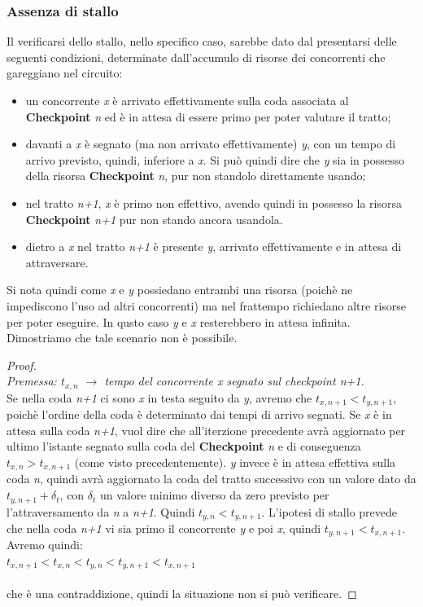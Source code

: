 \subsubsection{Assenza di stallo}
Il verificarsi dello stallo, nello specifico caso, sarebbe dato dal presentarsi
delle seguenti condizioni, determinate dall'accumulo di risorse dei concorrenti che gareggiano nel circuito:
\begin{itemize}
\item un concorrente \emph{x} è arrivato effettivamente sulla coda associata al \textbf{Checkpoint} \emph{n} ed
è in attesa di essere primo per poter valutare il tratto;
\item davanti a \emph{x} è segnato (ma non arrivato effettivamente) \emph{y}, con un tempo di arrivo previsto, quindi, inferiore a \emph{x}. 
Si può quindi dire che \emph{y} sia in possesso della risorsa \textbf{Checkpoint} \emph{n}, pur non standolo direttamente usando;
\item nel tratto \emph{n+1}, \emph{x} è primo non effettivo, avendo quindi in possesso la risorsa \textbf{Checkpoint} \emph{n+1} pur
non stando ancora usandola.
\item dietro a \emph{x} nel tratto \emph{n+1} è presente \emph{y}, arrivato effettivamente e in attesa di attraversare.
\end{itemize}
Si nota quindi come \emph{x} e \emph{y} possiedano entrambi una risorsa (poichè ne impediscono l'uso ad altri concorrenti)
ma nel frattempo richiedano altre risorse per poter eseguire. In qusto caso \emph{y} e \emph{x} resterebbero in attesa infinita.
Dimostriamo che tale scenario non è possibile.
\begin{proof}
\textcolor{white}{42}\\
\emph{Premessa: $t_{x,n}$ $\rightarrow$ tempo del concorrente \emph{x} segnato sul
checkpoint \emph{n+1}.}\\
	Se nella coda \emph{n+1} ci sono \emph{x} in testa seguito da \emph{y}, avremo che
$t_{x,n+1}<t_{y,n+1}$, poich\`{e} l'ordine della coda \`{e} 
	determinato dai tempi di arrivo segnati.
	Se \emph{x} \`{e} in attesa sulla coda \emph{n+1}, vuol dire che all'iterzione precedente avr\`{a} aggiornato per
ultimo l'istante segnato sulla coda del \textbf{Checkpoint} \emph{n} e di conseguenza $t_{x,n}>t_{x,n+1}$ (come visto precedentemente).
	\emph{y} invece \`{e} in attesa effettiva sulla coda \emph{n}, quindi avr\`{a}
aggiornato la coda del tratto successivo con un valore dato da $t_{y,n+1} + \delta_t$, 
	con $ \delta_t$ un valore minimo diverso da zero previsto per
l'attraversamento da \emph{n} a \emph{n+1}. Quindi $t_{y,n}<t_{y,n+1}$.
	L'ipotesi di stallo prevede che nella coda \emph{n+1} vi sia primo il concorrente \emph{y} e poi \emph{x},
quindi $t_{y,n+1}<t_{x,n+1}$.
	Avremo quindi:\\
	$t_{x,n+1}<t_{x,n}<t_{y,n}<t_{y,n+1}<t_{x,n+1}$\\\\
	che \`{e} una contraddizione, quindi la situazione non si pu\`{o}
verificare.
\end{proof}
